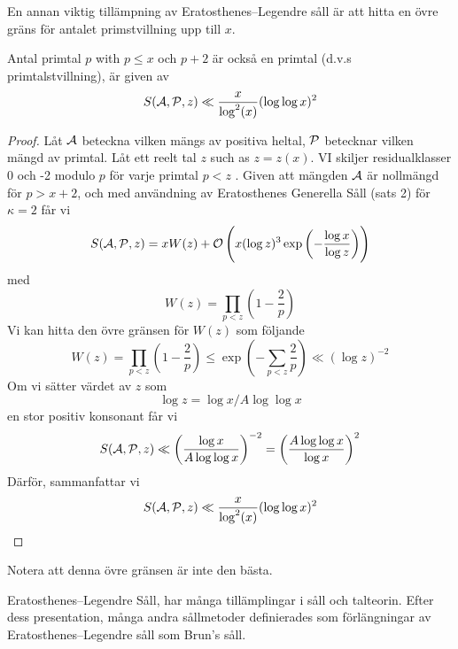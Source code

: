 En annan viktig tillämpning av Eratosthenes–Legendre såll är att hitta en övre gräns för antalet primstvillning upp till $ x $.
\begin{theorem}\hfill

Antal primtal $ p $ with $ p\leq x $ och $ p+2 $ är också en primtal (d.v.s primtalstvillning), är given av
\[\S\A\P z \ll\frac{x}{\log^{2}(x)}(\log\log x)^{2}\]
\end{theorem}
\begin{proof}
Låt $ \A $ beteckna vilken mängs av positiva heltal, $ \P $ betecknar vilken mängd av primtal. Låt ett reelt tal $ z $ such as $ z=z(x) $. VI skiljer residualklasser 0 och -2 modulo $ p $ för varje primtal $ p<z $ . Given att mängden $ \A $ är nollmängd för $ p>x+2 $, och med användning av Eratosthenes Generella Såll (sats 2) för $ \kappa=2 $ får vi
\[\S\A\P z = xW(z)+\mathcal{O} \left( x(\log z)^{3} \exp \left( -\frac{\log x}{\log z}\right) \right)\]
med
\[W(z)=\prod_{p<z}\left( 1-\frac{2}{p}\right)\]
Vi kan hitta den övre gränsen för $ W(z) $ som följande
\[W(z)=\prod_{p<z}\left( 1-\frac{2}{p}\right)\leq\exp \left( -\sum_{p<z}\frac{2}{p} \right)\ll (\log z)^{-2}\]
Om vi sätter värdet av $ z $ som
\[\log z = \log x/A\log\log x\]en stor positiv konsonant
får vi  
\[\S\A\P z \ll \left( \frac{\log x}{A\log\log x} \right)^{-2}=\left( \frac{A\log\log x}{\log x} \right)^{2}\]
Därför, sammanfattar vi
\[\S\A\P z \ll\frac{x}{\log^{2}(x)}(\log\log x)^{2}\]
\end{proof}
Notera att denna övre gränsen är inte den bästa. 
 


Eratosthenes–Legendre Såll, har många tillämplingar i såll och talteorin. Efter dess presentation, många andra sållmetoder definierades som förlängningar av Eratosthenes–Legendre såll som Brun's såll.

\printbibliography








